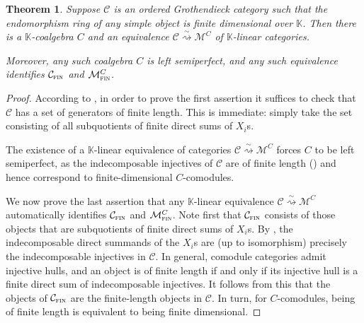 \documentclass[11pt]{article}
\theoremstyle{plain}
\newtheorem{theorem}[lemma]{Theorem}
\theoremstyle{nonumberplain}
\theoremstyle{plain}
\theoremstyle{nonumberplain}
\newtheorem{proof}{Proof}
\newcommand\bK{{\mathbb K}}
\newcommand\cC{{\mathcal C}}
\newcommand\cM{{\mathcal M}}
\DeclareMathOperator{\fin}{\cat{fin}}
\newcommand{\cat}[1]{\textsc{#1}}
\begin{document}
\begin{theorem}\label{th.comod}
  Suppose $\mathcal{C}$ is an ordered Grothendieck category such that the endomorphism ring of any simple object is finite dimensional over $\bK$. Then there is a $\bK$-coalgebra $C$ and an equivalence $\cC\overset{\sim}{\rightsquigarrow} \cM^C$ of $\bK$-linear categories. 

Moreover, any such coalgebra $C$ is left semiperfect, and any such equivalence identifies $\cC_{\fin}$ and $\cM^C_{\fin}$. 
\end{theorem}
%
%
%
%
\begin{proof}
According to \cite[Definitions 4.1 and 4.4, Theorem 5.1]{Tak77}, in order to prove the first assertion it suffices to check that $\cC$ has a set of generators of finite length. This is immediate: simply take the set consisting of all subquotients of finite direct sums of $X_i$s. 

The existence of a $\bK$-linear equivalence of categories $\cC \overset{\sim}{\rightsquigarrow} \cM^C$ forces $C$ to be left semiperfect, as the indecomposable injectives of $\cC$ are of finite length ()
and hence correspond to finite-dimensional $C$-comodules. 

We now prove the last assertion that any $\bK$-linear equivalence $\cC \overset{\sim}{\rightsquigarrow} \cM^C$ automatically identifies $\cC_{\fin}$ and $\cM^C_{\fin}$. Note first that $\cC_{\fin}$ consists of those objects that are subquotients of finite direct sums of $X_i$s. By , the indecomposable direct summands of the $X_i$s are (up to isomorphism) precisely the indecomposable injectives in $\cC$. In general, comodule categories admit injective hulls, and an object is of finite length if and only if its injective hull is a finite direct sum of indecomposable injectives. It follows from this that the objects of $\cC_{\fin}$ are the finite-length objects in $\cC$. In turn, for $C$-comodules, being of finite length is equivalent to being finite dimensional.
\end{proof}
\end{document}
